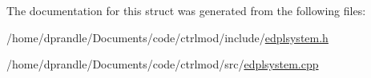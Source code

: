 The documentation for this struct was generated from the following files\-:\begin{DoxyCompactItemize}
\item 
/home/dprandle/\-Documents/code/ctrlmod/include/\hyperlink{edplsystem_8h}{edplsystem.\-h}\item 
/home/dprandle/\-Documents/code/ctrlmod/src/\hyperlink{edplsystem_8cpp}{edplsystem.\-cpp}\end{DoxyCompactItemize}
